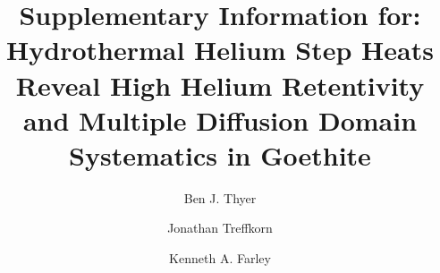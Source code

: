 \documentclass[preprint,12pt,authoryear]{elsarticle}
\begin{document}
\begin{frontmatter}
\title{Supplementary Information for: Hydrothermal Helium Step Heats Reveal High Helium Retentivity and Multiple Diffusion Domain Systematics in Goethite}
\author[caltech]{Ben J. Thyer}
\author[caltech]{Jonathan Treffkorn}
\author[caltech]{Kenneth A. Farley}
\end{frontmatter}





\end{document}
